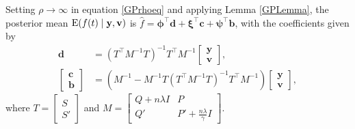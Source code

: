 Setting $\rho \rightarrow \infty$ in equation \eqref{GPrhoeq} and applying Lemma \ref{GPLemma}, the posterior mean $\mathrm{E} (f(t)\mid \mathbf{y},\mathbf{v})$ is $\hat{f}  = \mathbf{\phi}^\top \mathbf{d}+\mathbf{\xi}^\top \mathbf{c}+\mathbf{\psi}^\top \mathbf{b}$, with the coefficients given by
\begin{align} 
\mathbf{d}&=\left(T^\top M^{-1}T\right)^{-1}T^\top M^{-1}\begin{bmatrix}\mathbf{y} \\ \mathbf{v} \end{bmatrix},\\
\begin{bmatrix}\mathbf{c}\\ \mathbf{b}\end{bmatrix} &=
\left(M^{-1}-M^{-1}T\left(T^\top M^{-1} T\right)^{-1}T^\top M^{-1}\right)\begin{bmatrix}\mathbf{y}\\ \mathbf{v} \end{bmatrix},
\end{align} 
where $T=\begin{bmatrix} S\\S' \end{bmatrix}$ and $M=\begin{bmatrix} Q+n\lambda I& P\\
Q'& P'+\frac{n\lambda}{\gamma}I
\end{bmatrix}$.

